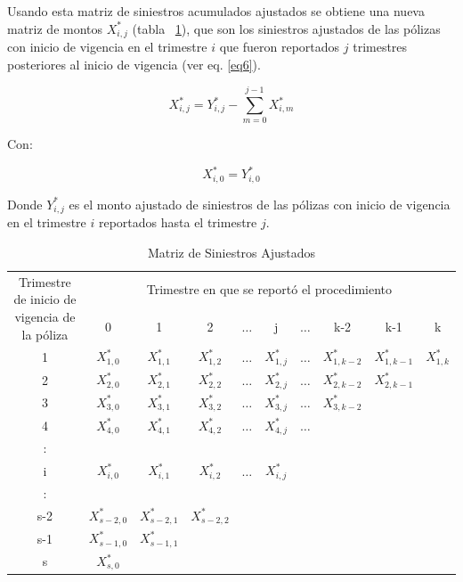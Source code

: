\documentclass[11pt,twoside,openright,spanish]{report}
\numberwithin{equation}{chapter}
\numberwithin{figure}{chapter}
\numberwithin{table}{chapter}
\begin{document}
	Usando esta matriz de siniestros acumulados ajustados se obtiene una nueva matriz de montos $X_{i,j}^{*}$ (tabla ~\ref{matrix4}), que son los siniestros ajustados de las pólizas con inicio de vigencia en el trimestre $i$ que fueron reportados $j$ trimestres posteriores al inicio de vigencia (ver eq. \ref{eq6}).
	
	\begin{equation}
	{X}_{i,j}^{*}={Y}_{i,j}^{*}-\sum _{m=0}^{j-1}{X}_{i,m}^{*}
	\label{eq6}
	\end{equation}	
	 
	Con:
	
	$${X}_{i,0}^{*}={Y}_{i,0}^{*}$$ 
	
	Donde ${Y}_{i,j}^{*}$ es el monto ajustado de siniestros de las pólizas con inicio de vigencia en el trimestre $i$ reportados hasta el trimestre $j$. 
	
	\begin{table}[ht]
		\centering
		\begin{tabularx}{\linewidth}{ c|ccccccccc}
		\multirow{2}{4cm}{Trimestre de inicio de vigencia de la póliza}&  \multicolumn{9}{c}{Trimestre en que se reportó el procedimiento} \\
			& 0  & 1 & 2 & $ \dots $ & j & $\dots $ & k-2 & k-1 &  k \\
			\midrule
			1      &  $X_{1,0}^{*}$ & $X_{1,1}^{*}$ & $X_{1,2}^{*}$ & $ \dots $ & $X_{1,j}^{*}$ & $ \dots $ & $X_{1,k-2}^{*}$ & $X_{1,k-1}^{*}$ & $X_{1,k}^{*}$ \\
			2      &  $X_{2,0}^{*}$ & $X_{2,1}^{*}$ & $X_{2,2}^{*}$ & $ \dots $ & $X_{2,j}^{*}$ & $ \dots $ & $X_{2,k-2}^{*}$ & $X_{2,k-1}^{*}$ & \\
			3      &  $X_{3,0}^{*}$ & $X_{3,1}^{*}$ & $X_{3,2}^{*}$ & $ \dots $ & $X_{3,j}^{*}$ & $ \dots $ & $X_{3,k-2}^{*}$ & & \\
			4      &  $X_{4,0}^{*}$ & $X_{4,1}^{*}$ & $X_{4,2}^{*}$ & $ \dots $ & $X_{4,j}^{*}$ & $ \dots $ & & & \\
			:      & & & & & & & & &\\
			i      &  $X_{i,0}^{*}$ & $X_{i,1}^{*}$ & $X_{i,2}^{*}$ & $ \dots $ & $X_{i,j}^{*}$ & & & & \\
			:      & & & & & & & & & \\
			s-2      &  $X_{s-2,0}^{*}$ & $X_{s-2,1}^{*}$ & $X_{s-2,2}^{*}$ & & & & & & \\
			s-1      &  $X_{s-1,0}^{*}$ & $X_{s-1,1}^{*}$ & & & & & & & \\
			s      &  $X_{s,0}^{*}$ & & & & & & & & \\
		\end{tabularx}
				\caption{Matriz de Siniestros  Ajustados}
				\label{matrix4}
	\end{table}
		
\end{document}
